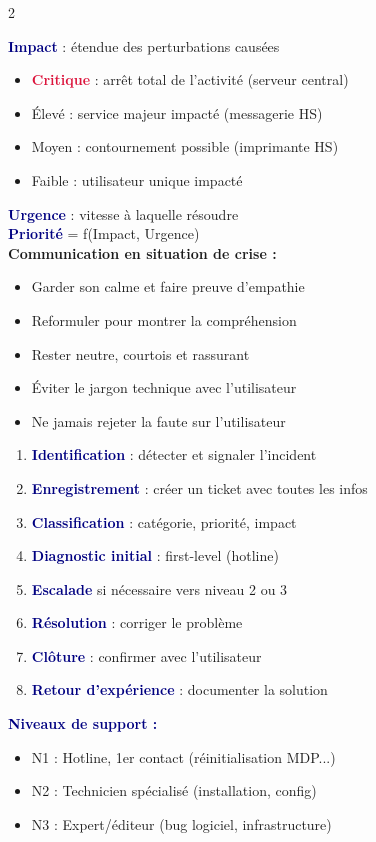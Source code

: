 \documentclass[a4paper,10pt]{article}
\newcommand{\key}[1]{\textbf{\textcolor{navy}{#1}}}
\newcommand{\warn}[1]{\textbf{\textcolor{crimson}{#1}}}
\begin{document}
\begin{multicols}{2}
\begin{tcolorbox}[basebox, colframe=crimson, title=5. Analyse d'impact et priorité]
\key{Impact} : étendue des perturbations causées
\begin{itemize}
  \item \warn{Critique} : arrêt total de l'activité (serveur central)
  \item Élevé : service majeur impacté (messagerie HS)
  \item Moyen : contournement possible (imprimante HS)
  \item Faible : utilisateur unique impacté
\end{itemize}
\vspace{4pt}
\key{Urgence} : vitesse à laquelle résoudre\\[4pt]
\key{Priorité} = f(Impact, Urgence)\\[4pt]
\textbf{Communication en situation de crise :}
\begin{itemize}
  \item Garder son calme et faire preuve d'empathie
  \item Reformuler pour montrer la compréhension
  \item Rester neutre, courtois et rassurant
  \item Éviter le jargon technique avec l'utilisateur
  \item Ne jamais rejeter la faute sur l'utilisateur
\end{itemize}
\end{tcolorbox}

\begin{tcolorbox}[basebox, colframe=navy, title=6. Processus de résolution d'incident]
\begin{enumerate}
  \item \key{Identification} : détecter et signaler l'incident
  \item \key{Enregistrement} : créer un ticket avec toutes les infos
  \item \key{Classification} : catégorie, priorité, impact
  \item \key{Diagnostic initial} : first-level (hotline)
  \item \key{Escalade} si nécessaire vers niveau 2 ou 3
  \item \key{Résolution} : corriger le problème
  \item \key{Clôture} : confirmer avec l'utilisateur
  \item \key{Retour d'expérience} : documenter la solution
\end{enumerate}
\vspace{4pt}
\key{Niveaux de support :}
\begin{itemize}
  \item N1 : Hotline, 1er contact (réinitialisation MDP...)
  \item N2 : Technicien spécialisé (installation, config)
  \item N3 : Expert/éditeur (bug logiciel, infrastructure)
\end{itemize}
\end{tcolorbox}


\end{multicols}
\end{document}
